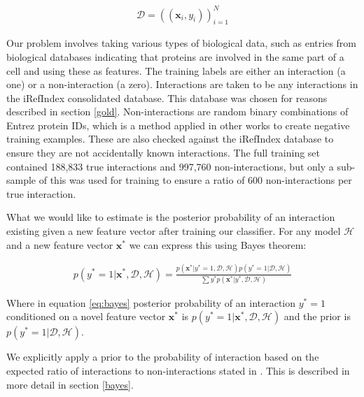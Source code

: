 \begin{align}
    \mathcal{D} = \left( ( \pmb{x}_{i}, y_{i} ) \right)_{i=1}^{N}
\end{align}


Our problem involves taking various types of biological data, such as entries from biological databases indicating that proteins are involved in the same part of a cell and using these as features.
The training labels are either an interaction (a one) or a non-interaction (a zero).
Interactions are taken to be any interactions in the iRefIndex\autocite{razick_irefindex:_2008} consolidated database.
This database was chosen for reasons described in section \ref{gold}.
Non-interactions are random binary combinations of Entrez protein IDs, which is a method applied in other works\autocite{qi_evaluation_2006} to create negative training examples.
These are also checked against the iRefIndex database to ensure they are not accidentally known interactions.
The full training set contained 188,833 true interactions and 997,760 non-interactions, but only a sub-sample of this was used for training to ensure a ratio of 600 non-interactions per true interaction.

What we would like to estimate is the posterior probability of an interaction existing given a new feature vector after training our classifier.
For any model $\mathcal{H}$ and a new feature vector $\pmb{x}^{*}$ we can express this using Bayes theorem:

\begin{align}
    p(y^{*} = 1 | \pmb{x}^{*}, \mathcal{D}, \mathcal{H}) = \frac{ p(\pmb{x}^{*}| y^{*} = 1 , \mathcal{D}, \mathcal{H}) p( y^{*} = 1 | \mathcal{D}, \mathcal{H})}{ \sum{y^{*}} p( \pmb{x}^{*} | y^{*}, \mathcal{D}, \mathcal{H})}
    \label{eq:bayes}
\end{align}

Where in equation \ref{eq:bayes} posterior probability of an interaction $y^{*} = 1$ conditioned on a novel feature vector $\pmb{x}^{*}$ is $p(y^{*} = 1 | \pmb{x}^{*}, \mathcal{D}, \mathcal{H})$ and the prior is $p( y^{*} = 1 | \mathcal{D}, \mathcal{H})$.

We explicitly apply a prior to the probability of interaction based on the expected ratio of interactions to non-interactions stated in \autocite{qi_evaluation_2006}.
This is described in more detail in section \ref{bayes}.

